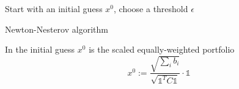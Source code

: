 \begin{algorithm}
Start with an initial guess $x^{0}$, choose a threshold $\epsilon$\\
\caption{Newton-Nesterov algorithm}
\label{alg:nesterov}
\end{algorithm}

In \cite{spinu} the initial guess $x^{0}$ is the scaled equally-weighted portfolio
\begin{equation}
x^{0} := \frac{\sqrt{\sum_i b_i}}{\sqrt{\mathds{1}^T C \mathds{1}}} \cdot \mathds{1}
\end{equation}

